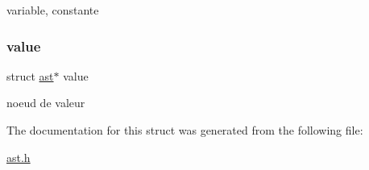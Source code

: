 variable, constante \mbox{\label{structast_a0547e48c9f9ecb35c94f988890f217b7}} 
\subsubsection{\texorpdfstring{value}{value}}
{\footnotesize\ttfamily struct \hyperlink{structast}{ast}$\ast$ value}

noeud de valeur 

The documentation for this struct was generated from the following file\+:\begin{DoxyCompactItemize}
\item 
\hyperlink{ast_8h}{ast.\+h}\end{DoxyCompactItemize}
